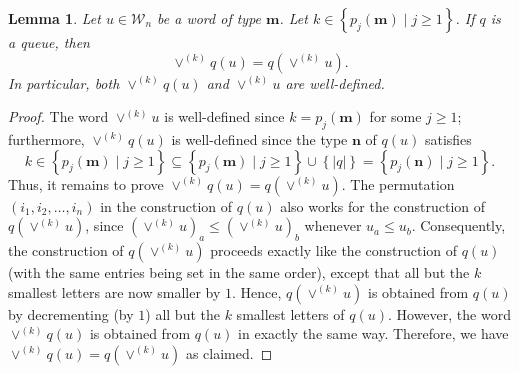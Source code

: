 \documentclass[reqno]{amsart}
\newcommand{\0}{\phantom{c}}
\newcommand{\mm}{\mathbf{m}}
\newcommand{\nn}{\mathbf{n}}
\newcommand{\mcW}{\mathcal{W}}
\newcommand{\set}[1]{\left\{ #1 \right\}}
\newcommand{\abs}[1]{\left| #1 \right|}
\newcommand{\tup}[1]{\left( #1 \right)}
\theoremstyle{plain}
\newtheorem{lemma}[thm]{Lemma}
\theoremstyle{definition}
\numberwithin{equation}{section}
\newcommand{\Travis}[1]{\todo[size=\tiny,inline,color=blue!30]{#1
      \\ \hfill --- Travis}}
\begin{document}

\begin{lemma}
\label{lemma:queue_merge_commute}
Let $u \in \mcW_n$ be a word of type $\mm$.
Let $k \in \set{ p_j(\mm) \mid j \geq 1 }$.
If $q$ is a queue, then
\[
\vee^{(k)} q(u) = q(\vee^{(k)} u).
\]
In particular, both $\vee^{(k)} q(u)$ and $\vee^{(k)} u$ are well-defined.
\end{lemma}

\begin{proof}
The word $\vee^{(k)} u$ is well-defined since $k = p_j(\mm)$ for some $j \geq 1$;
furthermore, $\vee^{(k)} q(u)$ is well-defined since the type $\nn$ of $q(u)$
satisfies
\[
k \in \set{ p_j(\mm) \mid j \geq 1 } \subseteq \set{ p_j(\mm) \mid j \geq 1 } \cup \set{\abs{q}} = \set{ p_j(\nn) \mid j \geq 1 }.
\]
Thus, it remains to prove $\vee^{(k)} q(u) = q(\vee^{(k)} u)$.
The permutation $\tup{i_1, i_2, \dotsc, i_n}$ in the construction of $q(u)$
also works for the construction of $q(\vee^{(k)} u)$,
since $(\vee^{(k)} u)_a \leq (\vee^{(k)} u)_b$ whenever $u_a \leq u_b$.
Consequently, the construction of $q(\vee^{(k)} u)$ proceeds exactly like
the construction of $q(u)$ (with the same entries being set in the same
order), except that all but the $k$ smallest letters are now smaller by $1$.
Hence, $q(\vee^{(k)} u)$ is obtained from $q(u)$ by decrementing (by $1$)
all but the $k$ smallest letters of $q(u)$.
However, the word $\vee^{(k)} q(u)$ is obtained from $q(u)$ in exactly the same way.
Therefore, we have $\vee^{(k)} q(u) = q(\vee^{(k)} u)$ as claimed.
\end{proof}
\end{document}
